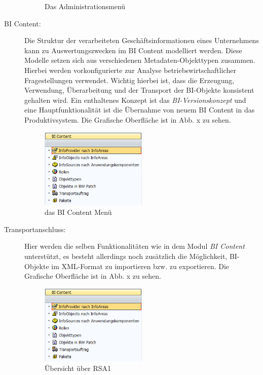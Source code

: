 \begin{description}
\begin{figure}[H]
    \caption{Das Administrationsmenü}
    \label{pic:DWOverview}
\end{figure}
\item[BI Content:] Die Struktur der verarbeiteten Geschäftsinformationen eines Unternehmens kann zu Auswertungszwecken im BI Content modelliert werden. Diese Modelle setzen sich aus verschiedenen Metadaten-Objekttypen zusammen. Hierbei werden vorkonfigurierte zur Analyse betriebswirtschaftlicher Fragestellungen verwendet. Wichtig hierbei ist, dass die Erzeugung, Verwendung, Überarbeitung und der Transport der BI-Objekte konsistent gehalten wird. Ein enthaltenes Konzept ist das \textit{BI-Versionskonzept} und eine Hauptfunktionalität ist die Übernahme von neuem BI Content in das Produktivsystem.
Die Grafische Oberfläche ist in Abb. x zu sehen.
\begin{figure}[H]
    \centering
    \includegraphics[width=0.5\textwidth]{files/BIContent}
    \caption{das BI Content Menü}
    \label{pic:DWOverview}
\end{figure}
\item[Transportanschluss:] Hier werden die selben Funktionalitäten wie in dem Modul \textit{BI Content} unterstützt, es besteht allerdings noch zusätzlich die Möglichkeit, BI-Objekte im XML-Format zu importieren bzw. zu exportieren.
Die Grafische Oberfläche ist in Abb. x zu sehen.
\begin{figure}[H]
    \centering
    \includegraphics[width=0.5\textwidth]{files/BIContent}
    \caption{Übersicht über RSA1}
    \label{pic:DWOverview}
\end{figure}

\end{description}
